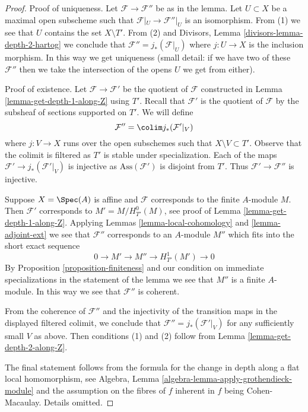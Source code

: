 \begin{proof}
Proof of uniqueness. Let $\mathcal{F} \to \mathcal{F}''$
be as in the lemma. Let $U \subset X$ be a maximal open
subscheme such that $\mathcal{F}|_U \to \mathcal{F}''|_U$
is an isomorphism. From (1) we see that $U$ contains the set $X \setminus T'$.
From (2) and Divisors, Lemma \ref{divisors-lemma-depth-2-hartog}
we conclude that $\mathcal{F}'' = j_*(\mathcal{F}|_U)$ where $j : U \to X$
is the inclusion morphism.
In this way we get uniqueness (small detail: if we have two
of these $\mathcal{F}''$ then we take the intersection of the opens $U$
we get from either).

\medskip\noindent
Proof of existence. Let $\mathcal{F} \to \mathcal{F}'$ be the quotient of
$\mathcal{F}$ constructed in Lemma \ref{lemma-get-depth-1-along-Z} using $T'$.
Recall that $\mathcal{F}'$ is the quotient of $\mathcal{F}$
by the subsheaf of sections supported on $T'$. We will define
$$
\mathcal{F}'' = \colim j_*(\mathcal{F}'|_V)
$$
where $j : V \to X$ runs over the open subschemes such that
$X \setminus V \subset T'$. Observe that the colimit is filtered
as $T'$ is stable under specialization. Each of the
maps $\mathcal{F}' \to j_*(\mathcal{F}'|_V)$ is injective
as $\text{Ass}(\mathcal{F}')$ is disjoint from $T'$.
Thus $\mathcal{F}' \to \mathcal{F}''$ is injective.

\medskip\noindent
Suppose $X = \Spec(A)$ is affine and $\mathcal{F}$
corresponds to the finite $A$-module $M$. Then $\mathcal{F}'$
corresponds to $M' = M / H^0_{T'}(M)$, see proof of
Lemma \ref{lemma-get-depth-1-along-Z}. Applying
Lemmas \ref{lemma-local-cohomology} and \ref{lemma-adjoint-ext}
we see that $\mathcal{F}''$ corresponds to an $A$-module
$M''$ which fits into the short exact sequence
$$
0 \to M' \to M'' \to H^1_{T'}(M') \to 0
$$
By Proposition \ref{proposition-finiteness} and our condition
on immediate specializations in the statement of the lemma
we see that $M''$ is a finite $A$-module. In this way
we see that $\mathcal{F}''$ is coherent.

\medskip\noindent
From the coherence of $\mathcal{F}''$ and the injectivity of the transition
maps in the displayed filtered colimit, we conclude that
$\mathcal{F}'' = j_*(\mathcal{F}'|_V)$ for any sufficiently small $V$ as above.
Then conditions (1) and (2) follow from Lemma \ref{lemma-get-depth-2-along-Z}.

\medskip\noindent
The final statement follows from the formula for the change in
depth along a flat local homomorphism, see
Algebra, Lemma \ref{algebra-lemma-apply-grothendieck-module}
and the assumption on the fibres of $f$ inherent in $f$ being
Cohen-Macaulay. Details omitted.
\end{proof}

